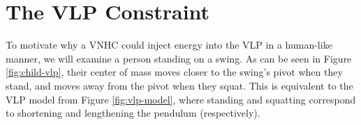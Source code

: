 
\section{The VLP Constraint}
To motivate why a VNHC could inject energy into the VLP in a human-like
manner, we will examine a person standing on a swing.
As can be seen in Figure \ref{fig:child-vlp}, their center of mass moves closer
to the swing's pivot when they stand, and moves away from the pivot when they
squat.
This is equivalent to the VLP model from Figure \ref{fig:vlp-model}, where
standing and squatting correspond to shortening and lengthening the pendulum
(respectively).
